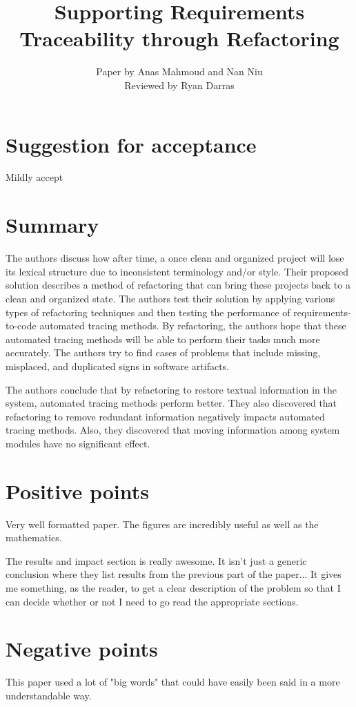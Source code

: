 \documentclass[11pt,twoside]{IEEEtran}
\title{Supporting Requirements Traceability through Refactoring}
\author{Paper by Anas Mahmoud and Nan Niu\\Reviewed by Ryan Darras}
\begin{document}
\maketitle

\section{Suggestion for acceptance}
Mildly accept

\section{Summary}
 The authors discuss how after time, a once clean and organized project will lose its lexical structure due to inconsistent terminology and/or style. Their proposed solution describes a method of refactoring that can bring these projects back to a clean and organized state. The authors test their solution by applying various types of refactoring techniques and then testing the performance of requirements-to-code automated tracing methods. By refactoring, the authors hope that these automated tracing methods will be able to perform their tasks much more accurately. The authors try to find cases of problems that include missing, misplaced, and duplicated signs in software artifacts.
 
 The authors conclude that by refactoring to restore textual information in the system, automated tracing methods perform better. They also discovered that refactoring to remove redundant information negatively impacts automated tracing methods. Also, they discovered that moving information among system modules have no significant effect.


\section{Positive points}
Very well formatted paper. The figures are incredibly useful as well as the mathematics.

The results and impact section is really awesome. It isn't just a generic conclusion where they list results from the previous part of the paper... It gives me something, as the reader, to get a clear description of the problem so that I can decide whether or not I need to go read the appropriate sections.


\section{Negative points}
This paper used a lot of "big words" that could have easily been said in a more understandable way.
\end{document}
